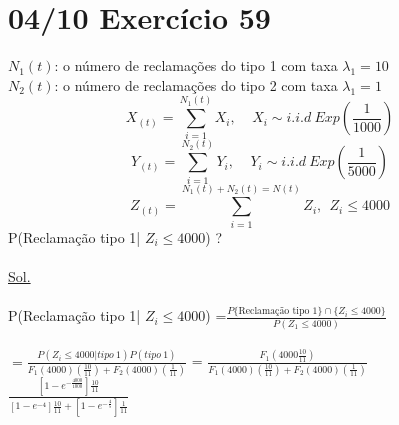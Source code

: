\documentclass[a4paper,12pt]{article}
\begin{document}
           \section*{04/10 Exercício 59}
           $N_1(t)$: o número de reclamações do tipo 1 com taxa $\lambda_1=10$\\
           $N_2(t)$: o número de reclamações do tipo 2 com taxa $\lambda_1=1$\\
                      $$X_{(t)}=\sum\limits_{i=1}^{N_1(t)}X_i, \ \ \ \ \ X_i \sim i.i.d\ Exp(\frac{1}{1000})  $$
                                            $$Y_{(t)}=\sum\limits_{i=1}^{N_2(t)}Y_i, \ \ \ \ \ Y_i \sim i.i.d\ Exp(\frac{1}{5000})  $$
                                                       $$Z_{(t)}=\sum\limits_{i=1}^{N_1(t)+N_2(t)=N(t)}Z_i  , \ \ Z_i\le 4000$$
                                                       P(Reclamação tipo 1| $Z_i\le4000$) ?\\
                                                       \\
                                                       \underline{Sol.}\\
                                                       \\
   P(Reclamação tipo 1| $Z_i\le4000$) =$\frac{P\{\text{Reclamação tipo 1}\}\cap\{Z_i\le 4000\}}{P(Z_1\le 4000)}$ \\
   \\
   $=\frac{P(Z_i\le4000|tipo \ 1)P(tipo \ 1)}{F_1(4000)\left(\frac{10}{11}\right)+F_2(4000)\left(\frac{1}{11}\right)}$ =  $\frac{F_1(4000\frac{10}{11})}{F_1(4000)\left(\frac{10}{11}\right)+F_2(4000)\left(\frac{1}{11}\right)}$\\
   $\frac{\left[1-e^{-\frac{4000}{1000}}\right]\frac{10}{11}}{\left[1-e^{-4}\right]\frac{10}{11}+\left[1-e^{-\frac{4}{5}}\right]\frac{1}{11}}$                              \newpage
\end{document}
